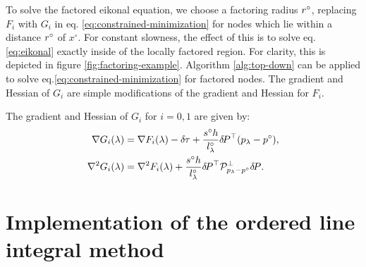 \documentclass[smallcondensed]{svjour3}
\begin{document}
To solve the factored eikonal equation, we choose a factoring radius
$r^\circ$, replacing $F_i$ with $G_i$ in eq.\@
\ref{eq:constrained-minimization} for nodes which lie within a
distance $r^\circ$ of $x^\circ$. For constant slowness, the effect of
this is to solve eq.\@ \ref{eq:eikonal} exactly inside of the
locally factored region. For clarity, this is depicted in figure
\ref{fig:factoring-example}. Algorithm \ref{alg:top-down} can be
applied to solve eq.\@ \ref{eq:constrained-minimization} for
factored nodes. The gradient and Hessian of $G_i$ are simple
modifications of the gradient and Hessian for $F_i$.

\begin{lemma}
  The gradient and Hessian of $G_i$ for $i = 0, 1$ are given
  by:
  \begin{align}
    \label{eq:G-grad-hess}
    \nabla G_i(\lambda) &= \nabla F_i(\lambda) - {\delta \hspace{-0.05em} \tau} + \frac{s^\circ h}{l^\circ_\lambda} {\delta \hspace{-0.14em} P}^\top {(p_\lambda - p^\circ)}, \\
    \nabla^2 G_i(\lambda) &= \nabla^2 F_i(\lambda) + \frac{s^\circ h}{l^\circ_\lambda} {\delta \hspace{-0.14em} P}^\top \mathcal{P}^\perp_{p_\lambda - p^\circ} {\delta \hspace{-0.14em} P}.
  \end{align}
\end{lemma}

\section{Implementation of the ordered line integral
  method}\label{sec:implementation}
\end{document}
